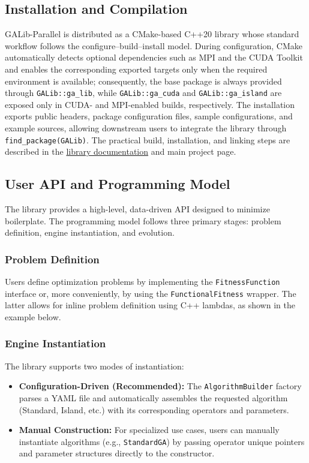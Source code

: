 \documentclass[conference]{IEEEtran}
\begin{document}
    \subsection{Installation and Compilation}
    GALib-Parallel is distributed as a CMake-based C++20 library whose standard workflow follows the configure--build--install model. During configuration, CMake automatically detects optional dependencies such as MPI and the CUDA Toolkit and enables the corresponding exported targets only when the required environment is available; consequently, the base package is always provided through \texttt{GALib::ga\_lib}, while \texttt{GALib::ga\_cuda} and \texttt{GALib::ga\_island} are exposed only in CUDA- and MPI-enabled builds, respectively. The installation exports public headers, package configuration files, sample configurations, and example sources, allowing downstream users to integrate the library through \texttt{find\_package(GALib)}. The practical build, installation, and linking steps are described in the \href{https://martik-k.github.io/GALib-Parallel/}{library documentation} and main project page.

    \subsection{User API and Programming Model}
    The library provides a high-level, data-driven API designed to minimize boilerplate. The programming model follows three primary stages: problem definition, engine instantiation, and evolution.

    \subsubsection{Problem Definition}
    Users define optimization problems by implementing the \texttt{FitnessFunction} interface or, more conveniently, by using the \texttt{FunctionalFitness} wrapper. The latter allows for inline problem definition using C++ lambdas, as shown in the example below.

    \subsubsection{Engine Instantiation}
    The library supports two modes of instantiation:
    \begin{itemize}
        \item \textbf{Configuration-Driven (Recommended):} The \texttt{AlgorithmBuilder} factory parses a YAML file and automatically assembles the requested algorithm (Standard, Island, etc.) with its corresponding operators and parameters.
        \item \textbf{Manual Construction:} For specialized use cases, users can manually instantiate algorithms (e.g., \texttt{StandardGA}) by passing operator unique pointers and parameter structures directly to the constructor.
    \end{itemize}
\end{document}
